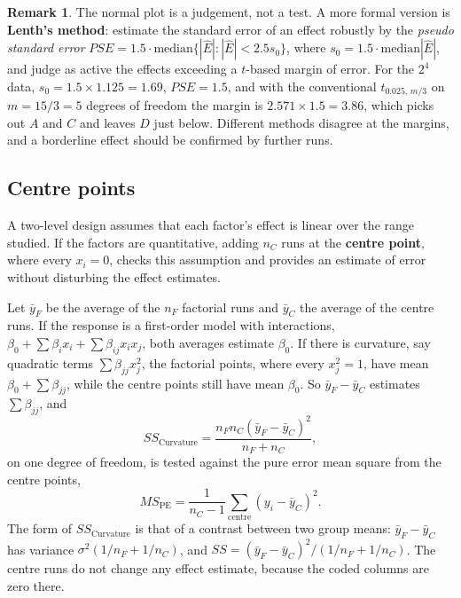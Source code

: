 \documentclass[11pt,a4paper]{article}
\numberwithin{equation}{section}
\theoremstyle{definition}
\newtheorem*{remark}{Remark}
\begin{document}
\begin{remark}
The normal plot is a judgement, not a test. A more formal version is \textbf{Lenth's method}: estimate the standard error of an effect robustly by
the \emph{pseudo standard error} $PSE = 1.5\cdot\mathrm{median}\{|\hat E| : |\hat E| < 2.5s_0\}$, where $s_0 = 1.5\cdot\mathrm{median}|\hat E|$, and judge as active the effects exceeding a $t$-based
margin of error. For the $2^4$ data, $s_0 = 1.5 \times 1.125 = 1.69$, $PSE = 1.5$, and with the conventional $t_{0.025,\,m/3}$ on $m = 15/3 = 5$ degrees of freedom the margin is
$2.571 \times 1.5 = 3.86$, which picks out $A$ and $C$ and leaves $D$ just below. Different methods disagree at the margins, and a borderline effect should be
confirmed by further runs.
\end{remark}

\subsection{Centre points}
A two-level design assumes that each factor's effect is linear over the range studied. If the factors are quantitative, adding $n_C$ runs at the
\textbf{centre point}, where every $x_i = 0$, checks this assumption and provides an estimate of error without disturbing the effect estimates.

Let $\bar y_F$ be the average of the $n_F$ factorial runs and $\bar y_C$ the average of the centre runs. If the response is a first-order model with
interactions, $\beta_0 + \sum\beta_ix_i + \sum\beta_{ij}x_ix_j$, both averages estimate $\beta_0$. If there is curvature, say quadratic terms $\sum\beta_{jj}x_j^2$, the factorial
points, where every $x_j^2 = 1$, have mean $\beta_0 + \sum\beta_{jj}$, while the centre points still have mean $\beta_0$. So $\bar y_F - \bar y_C$ estimates $\sum\beta_{jj}$, and
\[
SS_{\mathrm{Curvature}} = \frac{n_Fn_C(\bar y_F - \bar y_C)^2}{n_F + n_C} ,
\]
on one degree of freedom, is tested against the pure error mean square from the centre points,
\[
MS_{\mathrm{PE}} = \frac{1}{n_C - 1}\sum_{\text{centre}}(y_i - \bar y_C)^2 .
\]
The form of $SS_{\mathrm{Curvature}}$ is that of a contrast between two group means: $\bar y_F - \bar y_C$ has variance $\sigma^2(1/n_F + 1/n_C)$, and $SS = (\bar y_F - \bar y_C)^2/(1/n_F + 1/n_C)$. The centre
runs do not change any effect estimate, because the coded columns are zero there.
\end{document}
